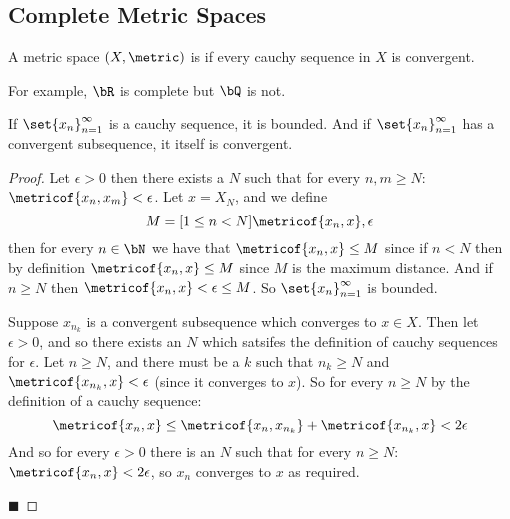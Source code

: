 \documentclass[10pt]{article}
\begin{document}


\bigskip

\subsection{Complete Metric Spaces}

\begin{defn*}

    A metric space $(X,\metric)$ is  if every cauchy sequence in $X$ is convergent.

\end{defn*}

For example, $\bR$ is complete but $\bQ$ is not.

\begin{prop*}

    If $\set{x_n}_{n=1}^\infty$ is a cauchy sequence, it is bounded.
    And if $\set{x_n}_{n=1}^\infty$ has a convergent subsequence, it itself is convergent.

\end{prop*}

\begin{proof}

    Let $\epsilon>0$ then there exists a $N$ such that for every $n,m\geq N$: $\metricof{x_n,x_m}<\epsilon$.
    Let $x=X_N$, and we define
    \[ M = \maxof[1\leq n< N]{\metricof{x_n,x}, \epsilon} \]
    then for every $n\in\bN$ we have that $\metricof{x_n,x}\leq M$ since if $n<N$ then by definition $\metricof{x_n,x}\leq M$ since $M$ is the maximum distance.
    And if $n\geq N$ then $\metricof{x_n,x}<\epsilon\leq M$.
    So $\set{x_n}_{n=1}^\infty$ is bounded.

    Suppose $x_{n_k}$ is a convergent subsequence which converges to $x\in X$.
    Then let $\epsilon>0$, and so there exists an $N$ which satsifes the definition of cauchy sequences for $\epsilon$.
    Let $n\geq N$, and there must be a $k$ such that $n_k\geq N$ and $\metricof{x_{n_k},x}<\epsilon$ (since it converges to $x$).
    So for every $n\geq N$ by the definition of a cauchy sequence:
    \[ \metricof{x_n, x} \leq \metricof{x_n, x_{n_k}} + \metricof{x_{n_k}, x} < 2\epsilon \]
    And so for every $\epsilon>0$ there is an $N$ such that for every $n\geq N$: $\metricof{x_n,x} < 2\epsilon$, so $x_n$ converges to $x$ as required.

    \hfill$\blacksquare$

\end{proof}
\end{document}
